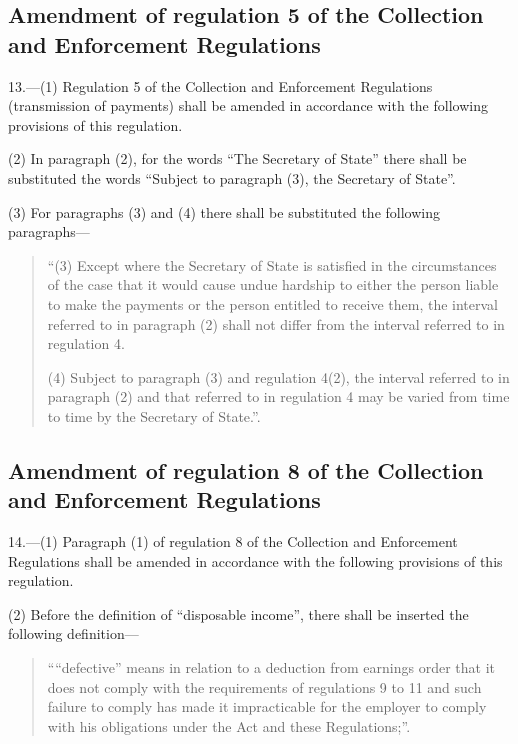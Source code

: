 \documentclass[12pt,a4paper]{article}
\begin{document}
\subsection[13. Amendment of regulation 5 of the Collection and Enforcement Regulations]{Amendment of regulation 5 of the Collection and Enforcement Regulations}

13.—(1) Regulation 5 of the Collection and Enforcement Regulations (transmission of payments) shall be amended in accordance with the following provisions of this regulation.

(2) In paragraph (2), for the words “The Secretary of State” there shall be substituted the words “Subject to paragraph (3), the Secretary of State”.

(3) For paragraphs (3) and (4) there shall be substituted the following paragraphs—
\begin{quotation}
“(3) Except where the Secretary of State is satisfied in the circumstances of the case that it would cause undue hardship to either the person liable to make the payments or the person entitled to receive them, the interval referred to in paragraph (2) shall not differ from the interval referred to in regulation 4.

(4) Subject to paragraph (3) and regulation 4(2), the interval referred to in paragraph (2) and that referred to in regulation 4 may be varied from time to time by the Secretary of State.”.
\end{quotation}

\subsection[14. Amendment of regulation 8 of the Collection and Enforcement Regulations]{Amendment of regulation 8 of the Collection and Enforcement Regulations}

14.—(1) Paragraph (1) of regulation 8 of the Collection and Enforcement Regulations shall be amended in accordance with the following provisions of this regulation.

(2) Before the definition of “disposable income”, there shall be inserted the following definition—
\begin{quotation}
““defective” means in relation to a deduction from earnings order that it does not comply with the requirements of regulations 9 to 11 and such failure to comply has made it impracticable for the employer to comply with his obligations under the Act and these Regulations;”.
\end{quotation}
\end{document}
